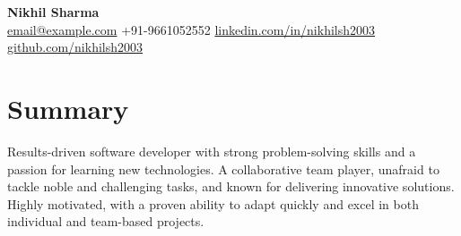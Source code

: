 \documentclass[a4paper,10pt]{article} %
\begin{document}
\begin{center}
    {\Huge \textbf{Nikhil Sharma}} \\
    \vspace{6pt} %
    \small
    \faEnvelope \href{mailto:email@example.com}{email@example.com} \hspace{1.5em} %
    \faMobile \hspace{0.3em} +91-9661052552 \hspace{1.5em} %
    \faLinkedinSquare \href{https://www.linkedin.com/in/nikhilsh2003/}{linkedin.com/in/nikhilsh2003} \hspace{1.5em} %
    \faGithub \href{https://github.com/nikhilsh2003}{github.com/nikhilsh2003} %
\end{center}

\vspace{0.7em} %

\section*{Summary}
Results-driven software developer with strong problem-solving skills and a passion for learning new technologies. A collaborative team player, unafraid to tackle noble and challenging tasks, and known for delivering innovative solutions. Highly motivated, with a proven ability to adapt quickly and excel in both individual and team-based projects.

\vspace{0.7em} %

\end{document}
